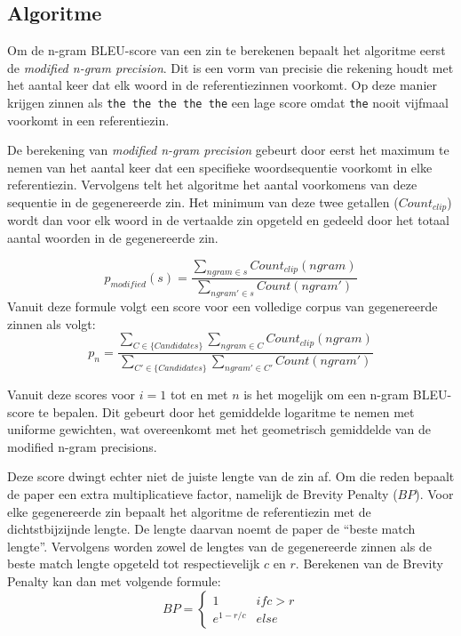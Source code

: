 \subsection{Algoritme}
Om de n-gram BLEU-score van een zin te berekenen bepaalt het algoritme eerst de \textit{modified n-gram precision}. Dit is een vorm van precisie die rekening houdt met het aantal keer dat elk woord in de referentiezinnen voorkomt. Op deze manier krijgen zinnen als \texttt{the the the the the} een lage score omdat \texttt{the} nooit vijfmaal voorkomt in een referentiezin. 

De berekening van \textit{modified n-gram precision} gebeurt door eerst het maximum te nemen van het aantal keer dat een specifieke woordsequentie voorkomt in elke referentiezin. Vervolgens telt het algoritme het aantal voorkomens van deze sequentie in de gegenereerde zin. Het minimum van deze twee getallen ($Count_ {clip}$) wordt dan voor elk woord in de vertaalde zin opgeteld en gedeeld door het totaal aantal woorden in de gegenereerde zin.

\begin{equation}
p_{modified}(s) =
\frac{\sum\limits_{ngram \in s} Count_{clip}(ngram)}{\sum\limits_{ngram' \in s} Count(ngram')}
\label{formule:ngramprecision}
\end{equation}
Vanuit deze formule volgt een score voor een volledige corpus van gegenereerde zinnen als volgt:
\begin{equation}
p_{n} =
\frac{\sum\limits_{C \in \{Candidates\} } \sum\limits_{ngram \in C} Count_{clip}(ngram)}{\sum\limits_{C' \in \{Candidates\} } \sum\limits_{ngram' \in C'} Count(ngram')}
\label{formule:corpus_modified}
\end{equation}

Vanuit deze scores voor $i=1$ tot en met $n$ is het mogelijk om een n-gram BLEU-score te bepalen. Dit gebeurt door het gemiddelde logaritme te nemen met uniforme gewichten, wat overeenkomt met het geometrisch gemiddelde van de modified n-gram precisions.

Deze score dwingt echter niet de juiste lengte van de zin af. Om die reden bepaalt de paper een extra multiplicatieve factor, namelijk de Brevity Penalty ($BP$). Voor elke gegenereerde zin bepaalt het algoritme de referentiezin met de dichtstbijzijnde lengte. De lengte daarvan noemt de paper de ``beste match lengte''. Vervolgens worden zowel de lengtes van de gegenereerde zinnen als de beste match lengte opgeteld tot respectievelijk $c$ en $r$. Berekenen van de Brevity Penalty kan dan met volgende formule:
\begin{equation}BP=
 \begin{cases}
1 & if c > r \\
e^{1-r/c} & else
\end{cases}
\end{equation}

